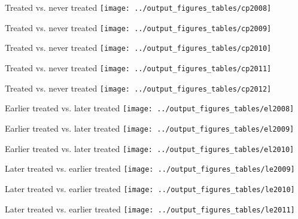\documentclass[8pt]{beamer}
\begin{document}
\begin{frame}{Treated vs. never treated}
	\texttt{[image: ../output\_figures\_tables/cp2008]}
\end{frame}

\begin{frame}{Treated vs. never treated}
	\texttt{[image: ../output\_figures\_tables/cp2009]}
\end{frame}

\begin{frame}{Treated vs. never treated}
	\texttt{[image: ../output\_figures\_tables/cp2010]}
\end{frame}

\begin{frame}{Treated vs. never treated}
	\texttt{[image: ../output\_figures\_tables/cp2011]}
\end{frame}

\begin{frame}{Treated vs. never treated}
	\texttt{[image: ../output\_figures\_tables/cp2012]}
\end{frame}

\begin{frame}{Earlier treated vs. later treated}
	\texttt{[image: ../output\_figures\_tables/el2008]}	
\end{frame}

\begin{frame}{Earlier treated vs. later treated}
	\texttt{[image: ../output\_figures\_tables/el2009]}	
\end{frame}

\begin{frame}{Earlier treated vs. later treated}
	\texttt{[image: ../output\_figures\_tables/el2010]}	
\end{frame}

\begin{frame}{Later treated vs. earlier treated}
	\texttt{[image: ../output\_figures\_tables/le2009]}	
\end{frame}

\begin{frame}{Later treated vs. earlier treated}
	\texttt{[image: ../output\_figures\_tables/le2010]}	
\end{frame}

\begin{frame}{Later treated vs. earlier treated}
	\texttt{[image: ../output\_figures\_tables/le2011]}	
\end{frame}
\end{document}
